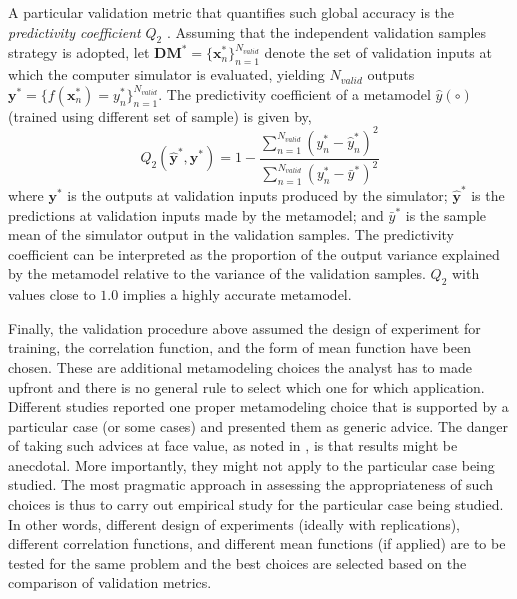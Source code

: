 A particular validation metric that quantifies such global accuracy is the \emph{predictivity coefficient} $Q_2$ \cite{Iooss2010}.
Assuming that the independent validation samples strategy is adopted, 
let $\mathbf{DM}^* = \{\mathbf{x}^*_n\}_{n=1}^{N_{valid}}$ denote the set of validation inputs at which the computer simulator is evaluated, 
yielding $N_{valid}$ outputs $\mathbf{y}^* = \{f(\mathbf{x}^*_n) = y^*_n\}_{n=1}^{N_{valid}}$.
The predictivity coefficient of a metamodel $\hat{y} (\circ)$ (trained using different set of sample) is given by, 
\begin{equation}
	Q_2 (\hat{\mathbf{y}}^*, \mathbf{y}^*) = 1 - \frac{\sum_{n=1}^{N_{valid}} (y^*_n - \hat{y}^*_n)^2}{\sum_{n=1}^{N_{valid}} (y^*_n - \bar{y}^*)^2}
\label{eq:predictivity_coefficient}
\end{equation} 
where $\mathbf{y}^*$ is the outputs at validation inputs produced by the simulator;
$\hat{\mathbf{y}}^*$ is the predictions at validation inputs made by the metamodel;
and $\bar{y}^*$ is the sample mean of the simulator output in the validation samples.
The predictivity coefficient can be interpreted as the proportion of the output variance explained by the metamodel relative to the variance of the validation samples.
$Q_2$ with values close to $1.0$ implies a highly accurate metamodel.

Finally, the validation procedure above assumed the design of experiment for training, the correlation function, and the form of mean function have been chosen.
These are additional metamodeling choices the analyst has to made upfront and there is no general rule to select which one for which application.
Different studies reported one proper metamodeling choice that is supported by a particular case (or some cases) and presented them as generic advice.
The danger of taking such advices at face value, as noted in \cite{Chen2016}, is that results might be anecdotal.
More importantly, they might not apply to the particular case being studied.
The most pragmatic approach in assessing the appropriateness of such choices is thus to carry out empirical study for the particular case being studied.
In other words, different design of experiments (ideally with replications), different correlation functions, and different mean functions (if applied) are to be tested for the same problem and the best choices are selected based on the comparison of validation metrics.

